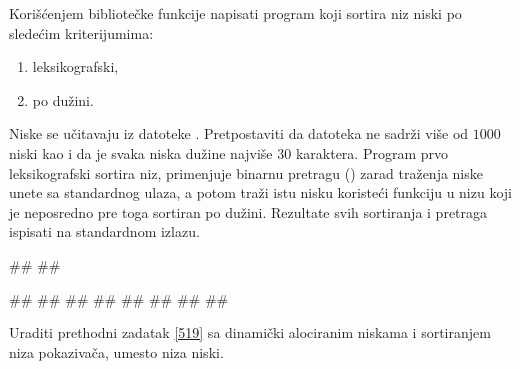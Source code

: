 \begin{Answer}[ref=518]
\end{Answer}
\begin{Exercise}[label=519]
   Korišćenjem bibliotečke funkcije  napisati program
   koji sortira niz niski po sledećim kriterijumima:
   \begin{enumerate}
   \item leksikografski,
   \item po dužini.
   \end{enumerate}
   Niske se učitavaju iz datoteke . Pretpostaviti da datoteka ne sadrži više od 
   $1000$ niski kao i da je svaka niska dužine najviše $30$ karaktera. Program prvo
   leksikografski sortira niz, primenjuje binarnu pretragu
   () zarad traženja niske unete sa standardnog ulaza,
   a potom traži istu nisku koristeći funkciju  u nizu koji je neposredno pre toga
   sortiran po dužini. Rezultate svih sortiranja
   i pretraga ispisati na standardnom izlazu.

   
\begin{maxitest}
\begin{upotreba}{1}
##
##
  
#\naslovInt#
##
##
##
##
##
##
##
\end{upotreba}
\end{maxitest}
  
\end{Exercise}

\begin{Answer}[ref=519]
\end{Answer}
\begin{Exercise}[label=520]
  Uraditi prethodni zadatak \ref{519} sa dinamički alociranim niskama
  i sortiranjem niza pokazivača, umesto niza niski.
  
\end{Exercise}

